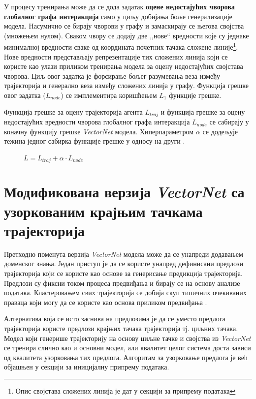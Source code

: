 \documentclass[11pt,oneside]{memoir}
\begin{document}
У процесу тренирања може да се дода задатак \textbf{оцене недостајућих чворова глобалног графа интеракција} само у циљу
добијања боље генерализације модела. Насумично се бирају чворови у графу и замаскирају
се његова својства (множењем нулом).
Сваком чвору се додају две ,,нове`` вредности које су једнаке минималној вредности сваке од координата почетних
тачака сложене линије\footnote{Опис својстава сложених линија је дат у секцији за припрему података}. Нове вредности представљају репрезентације тих сложених линија који се користе као улази приликом тренирања модела за оцену недостајућих својстава чворова. Циљ овог задатка је форсирање бољег разумевања
веза између трајекторија и генерално веза између сложених линија у графу. Функција грешке овог задатка ($L_{node}$) се имплементира коришћењем $L_1$
функције грешке.

Функција грешке за оцену трајекторија агента $L_{traj}$ и функција грешке за оцену
недостајућих вредности чворова глобалног графа интеракција $L_{node}$ се сабирају у коначну функцију грешке \textit{VectorNet} модела.
Хиперпараметром $\alpha$ се додељује тежина једног сабирка функције грешке у односу на други \cite{vectornet}.

\begin{figure}[H]
  \centering
  $L = L_{traj} + \alpha \cdot L_{node}$
\end{figure}

\section{Модификована верзија \textit{VectorNet} са узоркованим крајњим тачкама трајекторија}

Претходно поменута верзија \textit{VectorNet} модела може да се унапреди додавањем доменског знања. Један приступ је да се користе унапред
дефинисани предлози трајекторија који се користе као основе за генерисање предикција трајекторија. Предлози су фиксни током процеса
предвиђања и бирају се на основу анализе података. Кластеровањем свих трајекторија се добија скуп типичних очекиваних праваца
који могу да се користе као основа приликом предвиђања \cite{multipath}.

Алтернатива која се исто заснива на предлозима је да се уместо предлога трајекторија користе предлози крајњих тачака трајекторија
тј. циљних тачака. Модел који генерише трајекторију на основу циљне тачке и својства из \textit{VectorNet} се тренира слично као и основни модел, 
али квалитет целог система доста зависи од квалитета узорковања тих предлога. Алгоритам за узорковање предлога је већ објашњен у секцији за
иницијалну припрему података.
\end{document}

